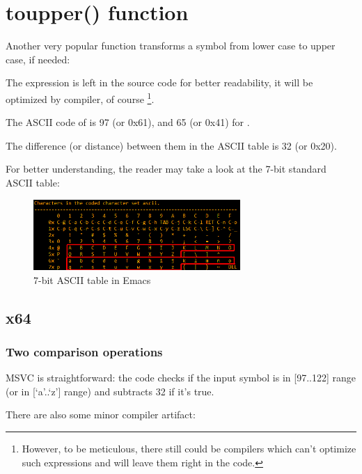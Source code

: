 \section{toupper() function}

Another very popular function transforms a symbol from lower case to upper case, if needed:



The  expression is left in the source code for better readability, it will be 
optimized by compiler, of course
\footnote{However, to be meticulous, there still could be compilers which can't optimize such expressions
and will leave them right in the code.}.

The \ac{ASCII} code of  is 97 (or 0x61), and 65 (or 0x41) for .

The difference (or distance) between them in the \ac{ASCII} table is 32 (or 0x20).

For better understanding, the reader may take a look at the 7-bit standard \ac{ASCII} table:

\begin{figure}[H]
\centering
\includegraphics[width=0.7\textwidth]{ascii.png}
\caption{7-bit \ac{ASCII} table in Emacs}
\end{figure}

\subsection{x64}

\subsubsection{Two comparison operations}

\NonOptimizing MSVC is straightforward: the code checks if the input symbol is in [97..122] range 
(or in [`a'..`z'] range) and subtracts 32 if it's true.

There are also some minor compiler artifact:



